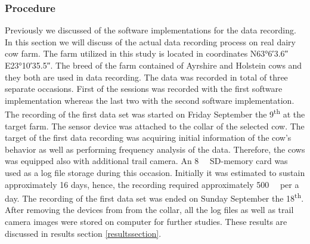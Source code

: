 \documentclass[english,12pt,a4paper,pdftex,elec,utf8]{aaltothesis}
\begin{document}
\subsubsection{Procedure} \label{proceduresection}

Previously we discussed of the software implementations for the data recording. In this section we will discuss of the actual data recording process on real dairy cow farm. The farm utilized in this study is located in coordinates N\ang{63;6;3.6} E\ang{23;10;35.5}. The breed of the farm contained of Ayrshire and Holstein cows and they both are used in data recording. The data was recorded in total of three separate occasions. First of the sessions was recorded with the first software implementation whereas the last two with the second software implementation. The recording of the first data set was started on Friday September the 9\textsuperscript{th} at the target farm. The sensor device was attached to the collar of the selected cow. The target of the first data recording was acquiring initial information of the cow's behavior as well as performing frequency analysis of the data. Therefore, the cows was equipped also with additional trail camera. An \SI{8}{\giga \byte} SD-memory card was used as a log file storage during this occasion. Initially it was estimated to sustain approximately 16 days, hence, the recording required approximately \SI{500}{\mega \byte} per a day. The recording of the first data set was ended on Sunday September the 18\textsuperscript{th}. After removing the devices from from the collar, all the log files as well as trail camera images were stored on computer for further studies. These results are discussed in results section \ref{resultssection}.
\end{document}
